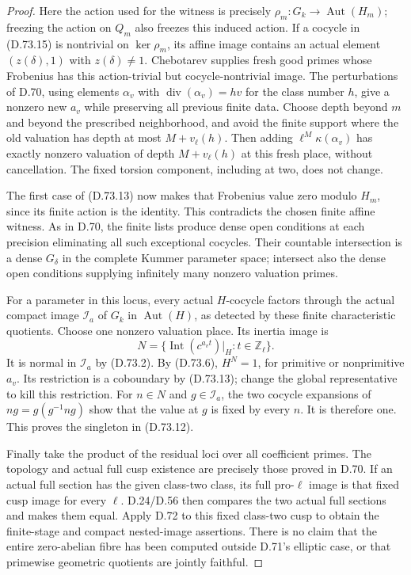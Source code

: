 \begin{proof}
Here the action used for the
witness is precisely
\(\rho_m:G_k\to\operatorname{Aut}(H_m)\);
freezing the action on \(Q_m\)
also freezes this induced action.
If a cocycle in (D.73.15) is
nontrivial on \(\ker\rho_m\), its affine
image contains an actual element
\((z(\delta),1)\) with
\(z(\delta)\ne1\). Chebotarev
\cite[V, Theorem 3.23]{PBC_MilneCFT}
supplies fresh good primes whose
Frobenius has this action-trivial
but cocycle-nontrivial image.
The perturbations of D.70,
using elements \(\alpha_v\) with
\(\operatorname{div}(\alpha_v)=h v\)
for the class number \(h\),
give a nonzero new \(a_v\) while
preserving all previous finite
data. Choose depth beyond
\(m\) and beyond the prescribed
neighborhood, and avoid the
finite support where the old
valuation has depth at most
\(M+v_\ell(h)\). Then adding
\(\ell^M\kappa(\alpha_v)\)
has exactly nonzero valuation
of depth \(M+v_\ell(h)\)
at this fresh place, without
cancellation. The fixed torsion
component, including at two,
does not change.

The first case of (D.73.13)
now makes that Frobenius value
zero modulo \(H_m\), since its
finite action is the identity.
This contradicts the chosen
finite affine witness. As in
D.70, the finite lists produce
dense open conditions at each
precision eliminating all such
exceptional cocycles. Their
countable intersection is a
dense \(G_\delta\) in the
complete Kummer parameter space;
intersect also the dense open
conditions supplying infinitely
many nonzero valuation primes.

For a parameter in this locus,
every actual \(H\)-cocycle
factors through the actual
compact image
\(\mathcal I_a\) of \(G_k\)
in \(\operatorname{Aut}(H)\),
as detected by these finite
characteristic quotients.
Choose one nonzero valuation
place. Its inertia image is
\[
 N=\{\operatorname{Int}(c^{a_v t})|_H:
                             t\in\mathbb Z_\ell\}.
                                                        \tag{D.73.16}
\]
It is normal in \(\mathcal I_a\)
by (D.73.2). By (D.73.6),
\(H^N=1\), for primitive or
nonprimitive \(a_v\).
Its restriction is a coboundary
by (D.73.13); change the
global representative to kill
this restriction. For \(n\in N\)
and \(g\in\mathcal I_a\), the
two cocycle expansions of
\(ng=g(g^{-1}ng)\) show that
the value at \(g\) is fixed
by every \(n\). It is therefore
one. This proves the singleton
in (D.73.12).

Finally take the product of
the residual loci over all
coefficient primes. The
topology and actual full cusp
existence are precisely those
proved in D.70. If an actual
full section has the given
class-two class, its full
pro-\(\ell\) image is that
fixed cusp image for every
\(\ell\). D.24/D.56 then
compares the two actual full
sections and makes them equal.
Apply D.72 to this fixed
class-two cusp to obtain the
finite-stage and compact
nested-image assertions.
There is no claim that the
entire zero-abelian fibre has
been computed outside D.71's
elliptic case, or that
primewise geometric quotients
are jointly faithful.
\end{proof}
